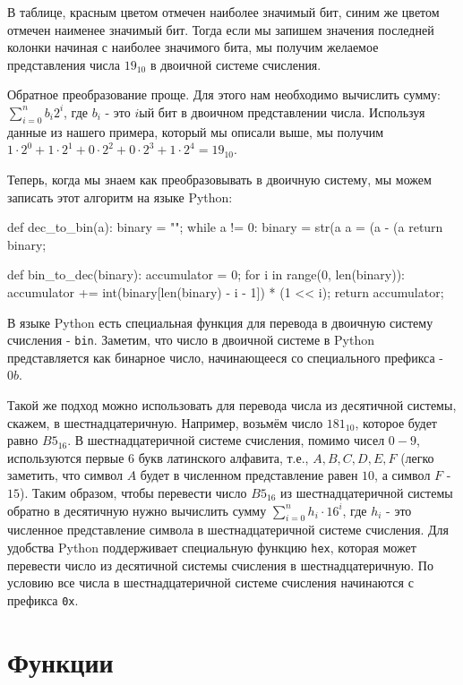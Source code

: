В таблице, красным цветом отмечен наиболее значимый бит, синим же 
цветом отмечен наименее значимый бит. Тогда если мы запишем значения
последней колонки начиная с наиболее значимого бита, мы получим 
желаемое представления числа $19_{10}$ в двоичной системе счисления. 

Обратное преобразование проще. Для этого нам необходимо вычислить сумму:
$\sum_{i=0}^n b_i2^i$, где $b_i$ - это $i$ый бит в двоичном представлении
числа. Используя данные из нашего примера, который мы описали выше, мы 
получим $1\cdot2^0+1\cdot2^1+0\cdot2^2+0\cdot2^3+1\cdot2^4 = 19_{10}$.

Теперь, когда мы знаем как преобразовывать в двоичную систему, мы можем записать
этот алгоритм на языке Python:

\begin{python}
def dec_to_bin(a):
	binary = "";
	while a != 0:
		binary = str(a %
		a = (a - (a %
	return binary;

def bin_to_dec(binary):
	accumulator = 0;
	for i in range(0, len(binary)):
		accumulator += int(binary[len(binary) - i - 1]) * (1 << i);
	return accumulator;
\end{python}

В языке Python есть специальная функция для перевода в двоичную систему счисления - \texttt{bin}.
Заметим, что число в двоичной системе в Python представляется как бинарное число, начинающееся со 
специального префикса - $0b$.

Такой же подход можно использовать для перевода числа из десятичной системы, скажем, в 
шестнадцатеричную. Например, возьмём число $181_{10}$, которое будет равно $B5_{16}$. 
В шестнадцатеричной системе счисления, помимо чисел $0-9$, используются первые $6$ букв 
латинского алфавита, т.е., $A, B, C, D, E, F$ (легко заметить, что символ $A$ будет в численном 
представление равен $10$, а символ $F$ - $15$). Таким образом, чтобы перевести число $B5_{16}$ из
шестнадцатеричной системы обратно в десятичную нужно вычислить сумму $\sum_{i=0}^{n} h_i \cdot 16^i$,
где $h_i$ - это численное представление символа в шестнадцатеричной системе счисления.
Для удобства Python поддерживает специальную функцию \texttt{hex}, которая может перевести 
число из десятичной системы счисления в шестнадцатеричную. По условию все числа в шестнадцатеричной 
системе счисления начинаются с префикса \texttt{0x}.

\section{Функции}

